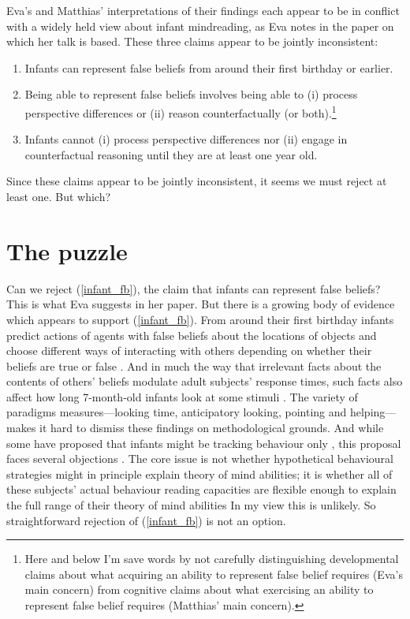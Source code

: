 \documentclass[12pt,\papersize]{extarticle}
\begin{document}
Eva's and Matthias' interpretations of their findings each appear to be in conflict with 
 a widely held view about infant mindreading, 
  as Eva notes in the paper on which her talk is based.
These three claims appear to be jointly inconsistent:
%
\begin{enumerate}
\item Infants can represent false beliefs from around their first birthday or earlier. \label{infant_fb}

\item  \label{fb_is_perspectives}  Being able to represent false beliefs involves being able to  (i) process perspective differences or (ii) reason counterfactually (or both).\footnote{
Here and below I'm save words by not carefully distinguishing 
 developmental claims about what acquiring an ability to represent false belief requires (Eva's main concern)
 from
 cognitive claims about what exercising an ability to represent false belief requires (Matthias' main concern).
}

\item Infants cannot (i) process perspective differences nor (ii) engage in counterfactual reasoning until they are at least one year old.  \label{infant_perspectives}

\end{enumerate}
%
Since these claims appear to be jointly inconsistent, it seems we must reject at least one.  But which?


\section{The puzzle}
Can we reject (\ref{infant_fb}), the claim that infants can represent false beliefs?  
This is what  Eva suggests in her paper.
But there is a growing body of evidence which appears to support  (\ref{infant_fb}).
From around their first birthday infants  predict actions of agents with false beliefs about the locations of objects \citep[]{en_1092, en_1208} and choose different ways of interacting with others depending on whether their beliefs are true or false \citep[]{en_1783,Knudsen:2011fk,southgate:2010fb}.  
And in much the way that irrelevant facts about the contents of others’ beliefs modulate adult subjects’ response times, such facts also affect how long 7-month-old infants look at some stimuli \citep[]{en_1821}.
The variety of paradigms measures---looking time, anticipatory looking, pointing and helping---makes it hard to dismiss these findings on methodological grounds.
And while some have proposed that infants might be tracking behaviour only \citet{en_1168, en_1169},
this proposal faces several objections \citep[e.g.][]{Song:2008qo}.
The core issue is not whether hypothetical behavioural strategies might in principle explain theory of mind abilities; it is whether all of these subjects’ actual behaviour reading capacities are flexible enough to explain the full range of their theory of mind abilities \citep[]{Apperly:2009ju}
In my view this is unlikely.
So straightforward rejection of  (\ref{infant_fb}) is not an option.
\end{document}
